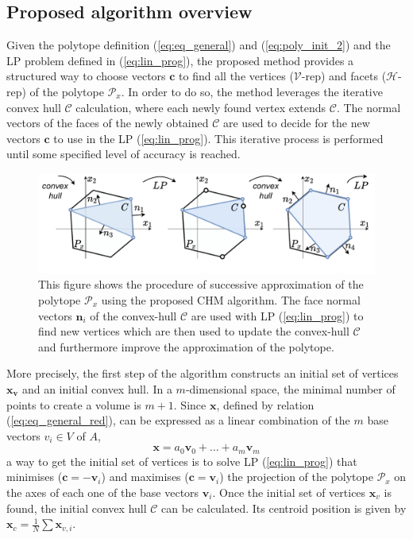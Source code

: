 \subsection{Proposed algorithm overview}
\label{ch:method}

Given the polytope definition (\ref{eq:eq_general}) and (\ref{eq:poly_init_2}) and the LP problem defined in (\ref{eq:lin_prog}), the proposed method provides a structured way to choose vectors $\bm{c}$ to find all the vertices ($\mathcal{V}$-rep) and facets ($\mathcal{H}$-rep) of the polytope $\mathcal{P}_x$. 
In order to do so, the method leverages the iterative convex hull $\mathcal{C}$ calculation, where each newly found vertex extends $\mathcal{C}$. The normal vectors of the faces of the newly obtained $\mathcal{C}$ are used to decide for the new vectors $\bm{c}$ to use in the LP (\ref{eq:lin_prog}). This iterative process is performed until some specified level of accuracy is reached.

\begin{figure}[!t]
    \centering
    \includegraphics[width=\linewidth]{Papers/images/poly_lp_vert_part.pdf}
    \vspace{-0.8cm}
    \caption{This figure shows the procedure of successive approximation of the polytope $\mathcal{P}_x$ using the proposed CHM algorithm. The face normal vectors $\bm{n}_i$ of the convex-hull $\mathcal{C}$ are used with LP (\ref{eq:lin_prog}) to find new vertices which are then used to update the convex-hull $\mathcal{C}$ and furthermore improve the approximation of the polytope. }
    \label{fig:algo_example}
\end{figure}

More precisely, the first step of the algorithm constructs an initial set of vertices $\bm{x_v}$ and an initial convex hull. In a $m$-dimensional space, the minimal number of points to create a volume is $m\!+\!1$. Since $\bm{x}$, defined by relation (\ref{eq:eq_general_red}), can be expressed as a linear combination of the $m$ base vectors $v_i\in V$ of $A$, $$\bm{x} = a_0 \bm{v}_0 + \dots +a_m \bm{v}_m$$ a way to get the initial set of vertices is to solve LP (\ref{eq:lin_prog}) that minimises ($\bm{c} = -\bm{v}_i$) and maximises ($\bm{c} = \bm{v}_i$) the projection of the polytope $\mathcal{P}_x$ on the axes of each one of the base vectors $\bm{v}_i$. Once the initial set of vertices $\bm{x}_v$ is found, the initial convex hull $\mathcal{C}$ can be calculated. Its centroid position is given by $\bm{x}_c\!=\!\frac{1}{N}\!\sum\bm{x}_{v,i}$. 

